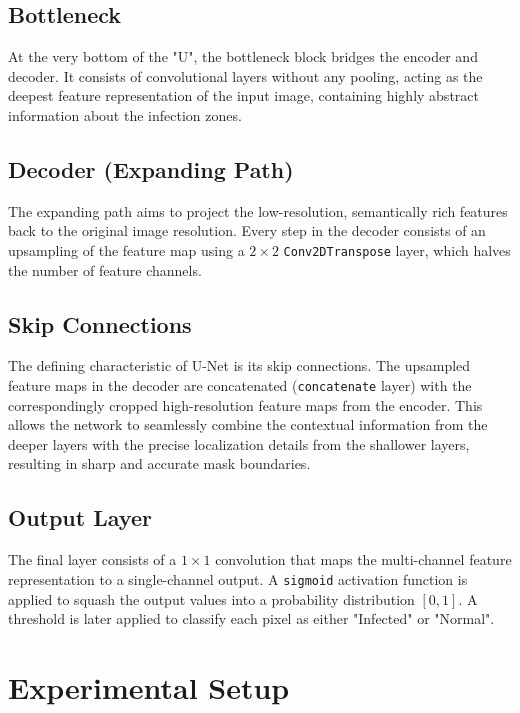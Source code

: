 \documentclass[conference]{IEEEtran}
\begin{document}
\subsection{Bottleneck}
At the very bottom of the "U", the bottleneck block bridges the encoder and decoder. It consists of convolutional layers without any pooling, acting as the deepest feature representation of the input image, containing highly abstract information about the infection zones.

\subsection{Decoder (Expanding Path)}
The expanding path aims to project the low-resolution, semantically rich features back to the original image resolution. Every step in the decoder consists of an upsampling of the feature map using a $2 \times 2$ \texttt{Conv2DTranspose} layer, which halves the number of feature channels. 

\subsection{Skip Connections}
The defining characteristic of U-Net is its skip connections. The upsampled feature maps in the decoder are concatenated (\texttt{concatenate} layer) with the correspondingly cropped high-resolution feature maps from the encoder. This allows the network to seamlessly combine the contextual information from the deeper layers with the precise localization details from the shallower layers, resulting in sharp and accurate mask boundaries.

\subsection{Output Layer}
The final layer consists of a $1 \times 1$ convolution that maps the multi-channel feature representation to a single-channel output. A \texttt{sigmoid} activation function is applied to squash the output values into a probability distribution $[0, 1]$. A threshold is later applied to classify each pixel as either "Infected" or "Normal".

\section{Experimental Setup}
\end{document}
